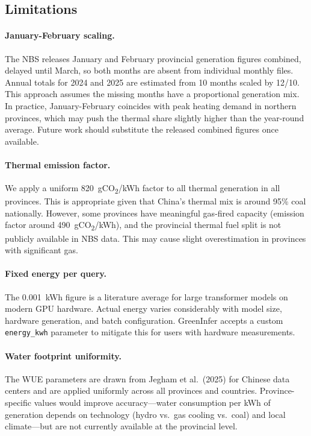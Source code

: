 \documentclass[11pt,a4paper]{article}
\begin{document}
\subsection{Limitations}
\label{sec:limitations}

\paragraph{January-February scaling.}
The NBS releases January and February provincial generation figures combined,
delayed until March, so both months are absent from individual monthly
files. Annual totals for 2024 and 2025 are estimated from 10 months scaled
by 12/10. This approach assumes the missing months have a proportional
generation mix. In practice, January-February coincides with peak heating
demand in northern provinces, which may push the thermal share slightly
higher than the year-round average. Future work should substitute the
released combined figures once available.

\paragraph{Thermal emission factor.}
We apply a uniform 820~gCO\textsubscript{2}/kWh factor to all thermal
generation in all provinces. This is appropriate given that China's thermal
mix is around 95\% coal nationally. However, some provinces have meaningful
gas-fired capacity (emission factor around 490~gCO\textsubscript{2}/kWh),
and the provincial thermal fuel split is not publicly available in NBS data.
This may cause slight overestimation in provinces with significant gas.

\paragraph{Fixed energy per query.}
The 0.001~kWh figure is a literature average for large transformer models on
modern GPU hardware. Actual energy varies considerably with model size,
hardware generation, and batch configuration. GreenInfer accepts a custom
\texttt{energy\_kwh} parameter to mitigate this for users with hardware
measurements.

\paragraph{Water footprint uniformity.}
The WUE parameters are drawn from Jegham et al.\ (2025) for Chinese data centers
and are applied uniformly across all provinces and countries. Province-specific
values would improve accuracy---water consumption per kWh of generation depends
on technology (hydro vs.\ gas cooling vs.\ coal) and local climate---but are
not currently available at the provincial level.
\end{document}
